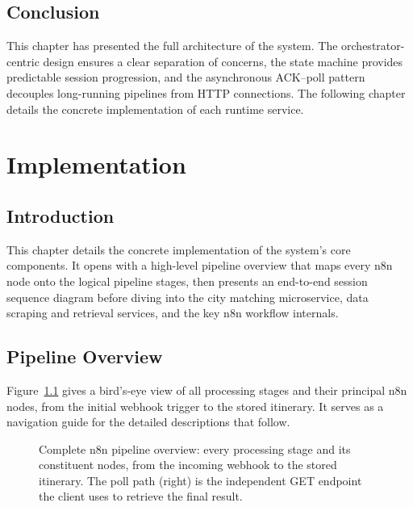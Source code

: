 \documentclass[12pt,a4paper]{report}
\begin{document}
\section*{Conclusion}

This chapter has presented the full architecture of the system. The orchestrator-centric design
ensures a clear separation of concerns, the state machine provides predictable session progression,
and the asynchronous ACK--poll pattern decouples long-running pipelines from HTTP connections. The
following chapter details the concrete implementation of each runtime service.

\chapter{Implementation}
 
\section*{Introduction}
 
This chapter details the concrete implementation of the system's core components. It opens with a
high-level pipeline overview that maps every n8n node onto the logical pipeline stages, then
presents an end-to-end session sequence diagram before diving into the city matching microservice,
data scraping and retrieval services, and the key n8n workflow internals.
 
\section{Pipeline Overview}
\label{sec:pipeline-overview}
 
Figure~\ref{fig:pipeline-overview} gives a bird's-eye view of all processing stages and their
principal n8n nodes, from the initial webhook trigger to the stored itinerary. It serves as a
navigation guide for the detailed descriptions that follow.
 
\begin{figure}[H]

\caption{Complete n8n pipeline overview: every processing stage and its constituent nodes, from
         the incoming webhook to the stored itinerary. The poll path (right) is the independent
         GET endpoint the client uses to retrieve the final result.}
\label{fig:pipeline-overview}
\end{figure}
 
\end{document}
